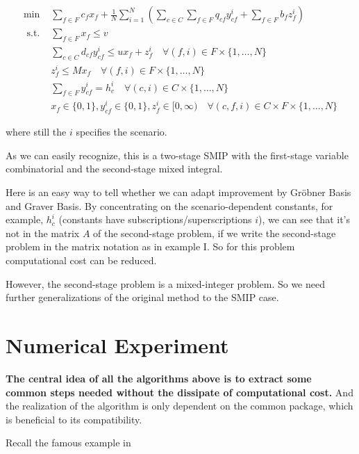 \documentclass{article}
\theoremstyle{plain}
\theoremstyle{definition}
\begin{document}
\begin{propsition}
\begin{align*}
\min & \sum_{f \in F} c_{f} x_{f}+\frac{1}{N} \sum_{i=1}^{N}\left(\sum_{c \in C} \sum_{f \in F} q_{c f} y_{c f}^{i}+\sum_{f \in F} b_{f} z_{f}^{i}\right)\\
\text { s.t. } & \sum_{f \in F} x_{f} \leq v  \\
& \sum_{c \in C} d_{c f} y_{c f}^{i} \leq u x_{f}+z_{f}^{i}  \quad \forall(f, i) \in F \times\{1, \ldots, N\} \\
& z_{f}^{i} \leq M x_{f} \quad \forall(f, i) \in F \times\{1, \ldots, N\}\\
& \sum_{f \in F} y_{c f}^{i}=h_{c}^{i} \quad \forall(c, i) \in C \times\{1, \ldots, N\}\\
& x_{f} \in\{0,1\}, y_{c f}^{i} \in\{0,1\}, z_{f}^{i} \in[0, \infty) \quad \forall(c, f, i) \in C \times F \times\{1, \ldots, N\}
\end{align*}

where still the $i$ specifies the scenario.

As we can easily recognize, this is a two-stage SMIP with the first-stage variable combinatorial and the second-stage mixed integral.

Here is an easy way to tell whether we can adapt improvement by Gröbner Basis and Graver Basis. By concentrating on the scenario-dependent constants, for example, $h_{c}^{i}$ (constants have subscriptions/superscriptions $i$), we can see that it's not in the matrix $A$ of the second-stage problem, if we write the second-stage problem in the matrix notation as in example I. So for this problem computational cost can be reduced. 

However, the second-stage problem is a mixed-integer problem. So we need further generalizations of the original method to the SMIP case.

\section{Numerical Experiment}

\textbf{The central idea of all the algorithms above is to extract some common steps needed without the dissipate of computational cost.} And the realization of the algorithm is only dependent on the common package, which is beneficial to its compatibility.

Recall the famous example in \cite{ref3}



\end{propsition}
\end{document}
